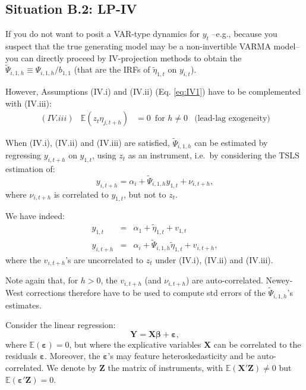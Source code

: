 \documentclass[
  12pt,
]{book}
\theoremstyle{definition}
\theoremstyle{definition}
\theoremstyle{definition}
\theoremstyle{definition}
\theoremstyle{remark}
\begin{document}
\hypertarget{LPIVa}{%
\subsection{Situation B.2: LP-IV}\label{LPIVa}}

If you do not want to posit a VAR-type dynamics for \(y_t\) --e.g., because you suspect that the true generating model may be a non-invertible VARMA model-- you can directly proceed by IV-projection methods to obtain the \(\tilde\Psi_{i,1,h}\equiv \Psi_{i,1,h}/b_{1,1}\) (that are the IRFs of \(\tilde\eta_{1,t}\) on \(y_{i,t}\)).

However, Assumptions (IV.i) and (IV.ii) (Eq. \eqref{eq:IV1}) have to be complemented with (IV.iii):
\begin{equation*}
\begin{array}{llll}
(IV.iii) & \mathbb{E}(z_t \eta_{j,t+h}) &= 0 \, \mbox{ for } h \ne 0 & \mbox{(lead-lag exogeneity)}
\end{array}
\end{equation*}

When (IV.i), (IV.ii) and (IV.iii) are satisfied, \(\tilde\Psi_{i,1,h}\) can be estimated by regressing \(y_{i,t+h}\) on \(y_{1,t}\), using \(z_t\) as an instrument, i.e.~by considering the TSLS estimation of:
\begin{equation}
y_{i,t+h} = \alpha_i + \tilde\Psi_{i,1,h}y_{1,t} + \nu_{i,t+h},\label{eq:regIV1}
\end{equation}
where \(\nu_{i,t+h}\) is correlated to \(y_{1,t}\), but not to \(z_t\).

We have indeed:
\begin{eqnarray*}
y_{1,t} &=& \alpha_1 + \tilde\eta_{1,t} + v_{1,t}\\
y_{i,t+h} &=& \alpha_i + \tilde\Psi_{i,1,h}\tilde\eta_{1,t} + v_{i,t+h},
\end{eqnarray*}
where the \(v_{i,t+h}\)'s are uncorrelated to \(z_t\) under (IV.i), (IV.ii) and (IV.iii).

Note again that, for \(h>0\), the \(v_{i,t+h}\) (and \(\nu_{i,t+h}\)) are auto-correlated. Newey-West corrections therefore have to be used to compute std errors of the \(\tilde\Psi_{i,1,h}\)'s estimates.

Consider the linear regression:
\[
\mathbf{Y} = \mathbf{X}\boldsymbol\beta + \boldsymbol\varepsilon,
\]
where \(\mathbb{E}(\boldsymbol\varepsilon)=0\), but where the explicative variables \(\mathbf{X}\) can be correlated to the residuals \(\boldsymbol\varepsilon\). Moreover, the \(\boldsymbol\varepsilon\)'s may feature heteroskedasticity and be auto-correlated. We denote by \(\mathbf{Z}\) the matrix of instruments, with \(\mathbb{E}(\mathbf{X}'\mathbf{Z}) \ne 0\) but \(\mathbb{E}(\boldsymbol\varepsilon'\mathbf{Z}) = 0\).
\end{document}

